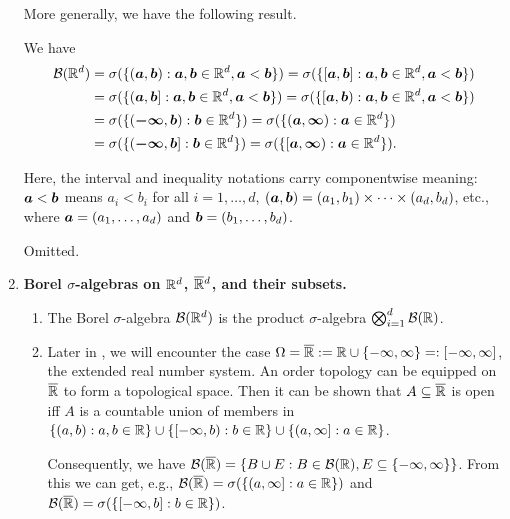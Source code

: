 \begin{enumerate}
More generally, we have the following result.
\begin{proposition}
\label{prp:borel-rd-generators}
We have
\begin{align*}
\mathcal{B}(\mathbb{R}^d)
&=\sigma(\{(\bm{a},\bm{b}):\bm{a},\bm{b}\in\mathbb{R}^d, \bm{a}<\bm{b}\})
=\sigma(\{[\bm{a},\bm{b}]:\bm{a},\bm{b}\in\mathbb{R}^d, \bm{a}<\bm{b}\}) \\
&=\sigma(\{(\bm{a},\bm{b}]:\bm{a},\bm{b}\in\mathbb{R}^d, \bm{a}<\bm{b}\})
=\sigma(\{[\bm{a},\bm{b}):\bm{a},\bm{b}\in\mathbb{R}^d, \bm{a}<\bm{b}\}) \\
&=\sigma(\{(\bm{-\infty},\bm{b}):\bm{b}\in\mathbb{R}^d\})
=\sigma(\{(\bm{a},\bm{\infty}):\bm{a}\in\mathbb{R}^d\}) \\
&=\sigma(\{(\bm{-\infty},\bm{b}]:\bm{b}\in\mathbb{R}^d\})
=\sigma(\{[\bm{a},\bm{\infty}):\bm{a}\in\mathbb{R}^d\}).
\end{align*}
\end{proposition}
\begin{note}
Here, the interval and inequality notations carry componentwise meaning:
\(\bm{a}<\bm{b}\) means \(a_i<b_i\) for all \(i=1,\dotsc,d\),
\((\bm{a},\bm{b})=(a_1,b_1)\times\dotsb\times (a_d,b_d)\), etc., where
\(\bm{a}=(a_1,\dotsc,a_d)\) and \(\bm{b}=(b_1,\dotsc,b_d)\).
\end{note}
\begin{pf}
Omitted.
\end{pf}
\item \textbf{Borel \(\sigma\)-algebras on \(\mathbb{R}^d\), \(\overline{\mathbb{R}}{}^d\), and their subsets.}
\begin{enumerate}
\item\label{it:borel-rd-prod-sig} The Borel \(\sigma\)-algebra \(\mathcal{B}(\mathbb{R}^d)\) is the
product \(\sigma\)-algebra \(\bigotimes_{i=1}^{d}\mathcal{B}(\mathbb{R})\).
\item Later in , we will encounter the case
\(\Omega=\overline{\mathbb{R}}:=\mathbb{R}\cup\{-\infty,\infty\}=:[-\infty,\infty]\), the extended real
number system. An order topology can be equipped on \(\overline{\mathbb{R}}\) to form a
topological space. Then it can be shown that \(A\subseteq \overline{\mathbb{R}}\) is open iff
\(A\) is a countable union of members in
\(\{(a,b):a,b\in\mathbb{R}\}\cup\{[-\infty,b):b\in\mathbb{R}\}\cup\{(a,\infty]:a\in\mathbb{R}\}\).

Consequently, we have \(\mathcal{B}(\overline{\mathbb{R}})=\{B\cup E:B\in\mathcal{B}(\mathbb{R}), E\subseteq \{-\infty,\infty\}\}\).
From this we can get, e.g., \(\mathcal{B}(\overline{\mathbb{R}})=\sigma(\{(a,\infty]:a\in\mathbb{R}\})
\) and \(\mathcal{B}(\overline{\mathbb{R}})=\sigma(\{[-\infty,b]:b\in\mathbb{R}\})\).


\end{enumerate}
\end{enumerate}
